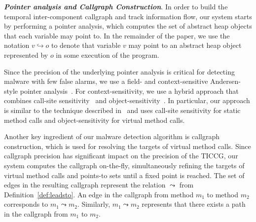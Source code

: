 \documentclass{article}
\begin{document}
{\bf \emph{Pointer analysis and Callgraph Construction}}. In order to build the temporal inter-component callgraph and track information flow, our system starts by performing a pointer analysis, 
which computes the set of abstract heap objects that each variable may point to. In the remainder of the paper, we use the notation 
 $v \hookrightarrow o$ to denote  that 
variable $v$ may point to an abstract heap object  represented by  $o$ in some execution of the program. 



Since the precision of the underlying pointer analysis  is critical for detecting malware with few false alarms, 
we use a field- and context-sensitive Andersen-style pointer analysis~\cite{andersen}. For context-sensitivity, we use a hybrid approach
that combines call-site sensitivity~\cite{kcfa} and object-sensitivity~\cite{MilanovaRR05}. 
In particular, our approach is  similar to the technique described in~\cite{hybrid-context} and uses
call-site sensitivity for static method calls and object-sensitivity for virtual method calls. 

Another key ingredient of our  malware detection algorithm is callgraph construction, which is used for resolving the 
targets of virtual method calls. Since callgraph precision  has significant impact on the precision of the TICCG, 
our system computes the callgraph on-the-fly, simultaneously refining the targets of virtual method calls and points-to sets  until a fixed point is reached. The set of edges in the resulting callgraph represent the relation $\leadsto$ from
Definition~\ref{def:leadsto}. An edge in the callgraph from method $m_1$
to  method $m_2$ corresponds to $m_1 \leadsto m_2$.
Similarly, $m_1 \leadsto m_2$
represents that there exists a path in the callgraph from 
$m_1$ to  $m_2$.
\end{document}
